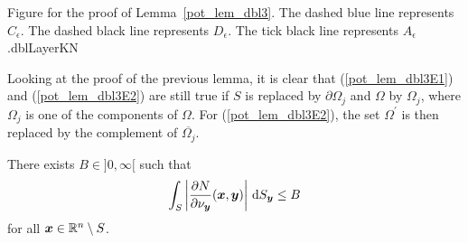 {Figure for the proof of Lemma~\ref{pot_lem_dbl3}.  The dashed blue
line represents $C_\epsilon$.  The dashed black line represents
$D_\epsilon$.  The tick black line represents $A_\epsilon$.}{dblLayerKN}

\begin{rmk}
Looking at the proof of the previous lemma, it is clear that
(\ref{pot_lem_dbl3E1}) and (\ref{pot_lem_dbl3E2}) are still true if
$S$ is replaced by $\partial \Omega_j$ and $\Omega$ by $\Omega_j$,
where $\Omega_j$ is one of the components of $\Omega$.  For
(\ref{pot_lem_dbl3E2}), the set $\Omega^{\prime}$ is then replaced by
the complement of $\overline{\Omega_j}$.     \label{pot_lem_dbl3_rmk}
\end{rmk}

\begin{lemma} \label{pot_lem_dbl4}
There exists $B \in ]0,\infty[$ such that 
\[
\int_S \left| \frac{\partial{N}}{\partial \nu_{{\bm{y}}}}({\bm{x}},{\bm{y}})
\right| \,\mathrm{d}{S}_{{\bm{y}}} \leq B
\]
for all ${\bm{x}} \in \mathbb{R}^n\setminus S$.
\end{lemma}

